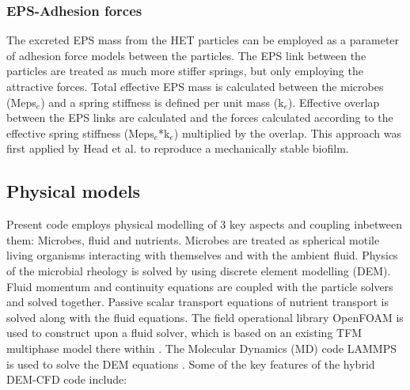 \documentclass[11pt,a4paper,openright]{article}
\begin{document}
\subsubsection{EPS-Adhesion forces}\label{adhmol}
The excreted EPS mass from the HET particles can be employed as a parameter of adhesion force models between the particles. The EPS link between the particles are treated as much more stiffer springs, but only employing the attractive forces. Total effective EPS mass is calculated between the microbes (Meps$_{e}$) and a spring stiffness is defined per unit mass (k$_{e}$). Effective overlap between the EPS links are calculated and the forces calculated according to the effective spring stiffness (Meps$_{e}$*k$_{e}$) multiplied by the overlap. This approach was first applied by Head et al. to reproduce a mechanically stable biofilm. 

\subsection{Physical models}

Present code employs physical modelling of 3 key aspects and coupling inbetween them: Microbes, fluid and nutrients. 
Microbes are treated as spherical motile living organisms interacting with themselves and with the ambient fluid. Physics of the microbial rheology is solved by using discrete element modelling (DEM). Fluid momentum and continuity equations are coupled with the particle solvers and solved together. Passive scalar transport equations of nutrient transport is solved along with the fluid equations. The field operational library OpenFOAM is used to construct upon a fluid solver, which is based on an existing TFM multiphase model there within \citep{rusche2003computational}. The Molecular Dynamics (MD) code LAMMPS is used to solve the DEM equations \citep{plimpton1995fast}. Some of the key features of the hybrid DEM-CFD code include:
\end{document}
